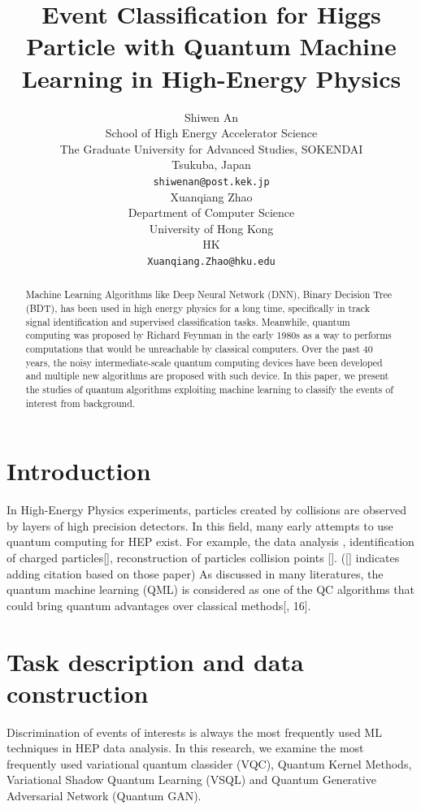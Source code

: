 \documentclass{article}
\title{Event Classification for Higgs Particle with Quantum Machine Learning in 
      High-Energy Physics}
\author{
 Shiwen An \\
  School of High Energy Accelerator Science\\
  The Graduate University for Advanced Studies, SOKENDAI\\
  Tsukuba, Japan \\
  \texttt{shiwenan@post.kek.jp} \\
   \And
  Xuanqiang Zhao \\
  Department of Computer Science\\
  University of Hong Kong\\
  HK \\
  \texttt{Xuanqiang.Zhao@hku.edu} \\
}
\begin{document}
\maketitle
\begin{abstract}
Machine Learning Algorithms like Deep Neural Network (DNN), Binary Decision Tree (BDT), has been used in 
high energy physics for a long time, specifically in track signal identification and supervised classification tasks. 
Meanwhile, quantum computing was proposed by Richard Feynman in the early 1980s as a way to performs computations that 
would be unreachable by classical computers. Over the past 40 years, the noisy intermediate-scale quantum computing 
devices have been developed and multiple new algorithms are proposed with such device. In this paper, we present the 
studies of quantum algorithms exploiting machine learning to classify the events of interest from background.
\end{abstract}




\section{Introduction}
In High-Energy Physics experiments, particles created by collisions are observed by layers of high precision detectors.
In this field, many early attempts to use quantum computing for HEP exist. For example, the data analysis \cite{qml_task1}, identification
of charged particles[], reconstruction of particles collision points []. ([] indicates adding citation based on those paper) As discussed in 
many literatures, the quantum machine learning (QML) is considered as one of the QC algorithms that could bring quantum 
advantages over classical methods[\cite{qml_icepp}, 16].

\section{Task description and data construction}
Discrimination of events of interests is always the most frequently used ML techniques in HEP data analysis. 
In this research, we examine the most frequently used variational quantum classider (VQC), Quantum Kernel Methods, 
Variational Shadow Quantum Learning (VSQL) \cite{qml_vsql} and Quantum Generative Adversarial Network (Quantum GAN). 
\label{sec:headings}
\end{document}
